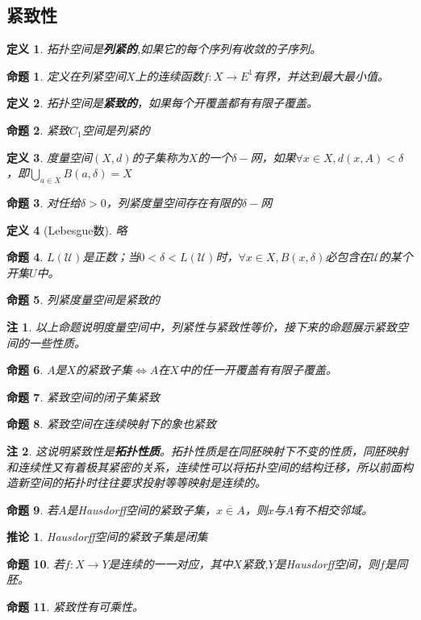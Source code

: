 \documentclass[UTF8]{ctexart}
\newtheorem{dfnt}{定义}
\newtheorem*{coro}{推论}
\newtheorem*{note}{注}
\newtheorem{pro}{命题}
\begin{document}
\subsection{紧致性}
\begin{dfnt}
拓扑空间是\textbf{列紧的},如果它的每个序列有收敛的子序列。
\end{dfnt}
\begin{pro}
定义在列紧空间$X$上的连续函数$f:X\rightarrow E^1$有界，并达到最大最小值。
\end{pro}
\begin{dfnt}
拓扑空间是\textbf{紧致的}，如果每个开覆盖都有有限子覆盖。
\end{dfnt}
\begin{pro}
紧致$C_1$空间是列紧的
\end{pro}
\begin{dfnt}
度量空间$(X,d)$的子集称为$X$的一个$\delta-$网，如果$\forall x \in X,d(x,A)<\delta$，即$\displaystyle \bigcup_{a \in X}B(a,\delta) = X$
\end{dfnt}
\begin{pro}
对任给$\delta > 0$，列紧度量空间存在有限的$\delta -$网
\end{pro}
\begin{dfnt}[Lebesgue数]
略
\end{dfnt}
\begin{pro}
$L(\mathscr{U})$是正数；当$0<\delta<L(\mathscr{U})$时，$\forall x \in X,B(x,\delta)$必包含在$\mathscr{U}$的某个开集$U$中。
\end{pro}
\begin{pro}
列紧度量空间是紧致的
\end{pro}
\begin{note}
以上命题说明度量空间中，列紧性与紧致性等价，接下来的命题展示紧致空间的一些性质。
\end{note}
\begin{pro}
$A$是$X$的紧致子集$\Longleftrightarrow A$在$X$中的任一开覆盖有有限子覆盖。
\end{pro}
\begin{pro}
紧致空间的闭子集紧致
\end{pro}
\begin{pro}
紧致空间在连续映射下的象也紧致
\end{pro}
\begin{note}
这说明紧致性是\textbf{拓扑性质}。拓扑性质是在同胚映射下不变的性质，同胚映射和连续性又有着极其紧密的关系，连续性可以将拓扑空间的结构迁移，所以前面构造新空间的拓扑时往往要求投射等等映射是连续的。
\end{note}
\begin{pro}
若$A$是Hausdorff空间的紧致子集，$x \overline{\in} A$，则$x$与$A$有不相交邻域。
\end{pro}
\begin{coro}
Hausdorff空间的紧致子集是闭集
\end{coro}
\begin{pro}
若$f:X\rightarrow Y$是连续的一一对应，其中$X$紧致,$Y$是Hausdorff空间，则$f$是同胚。
\end{pro}
\begin{pro}
紧致性有可乘性。
\end{pro}
\end{document}
